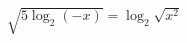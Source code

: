 \begin{ex}[type=equation]
	\begin{condition}
		$\sqrt{5\log_2(-x)} = \log_2\sqrt{x^2}$
	\end{condition}
\end{ex}
